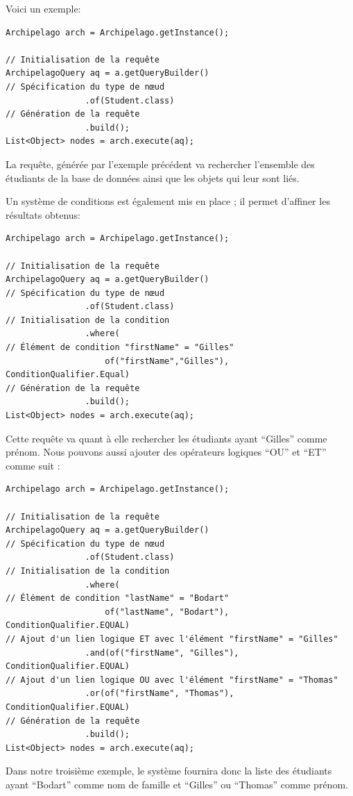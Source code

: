 \documentclass[a4paper,fleqn,12pt,oneside]{book}
\begin{document}
Voici un exemple:

\begin{lstlisting}
Archipelago arch = Archipelago.getInstance();

// Initialisation de la requête
ArchipelagoQuery aq = a.getQueryBuilder()
// Spécification du type de nœud
                .of(Student.class)
// Génération de la requête
                .build();
List<Object> nodes = arch.execute(aq);
\end{lstlisting}

La requête, générée par l'exemple précédent va rechercher l'ensemble des étudiants de la base de données ainsi que les objets qui leur sont liés.

Un système de conditions est également mis en place ; il permet d'affiner les résultats obtenus: 

\begin{lstlisting}
Archipelago arch = Archipelago.getInstance();

// Initialisation de la requête
ArchipelagoQuery aq = a.getQueryBuilder()
// Spécification du type de nœud
                .of(Student.class)
// Initialisation de la condition
                .where(
// Élément de condition "firstName" = "Gilles"
                	of("firstName","Gilles"), ConditionQualifier.Equal)
// Génération de la requête
                .build();
List<Object> nodes = arch.execute(aq);
\end{lstlisting}

Cette requête va quant à elle rechercher les étudiants ayant \enquote{Gilles} comme prénom.
\newpage
Nous pouvons aussi ajouter des opérateurs logiques \enquote{OU} et \enquote{ET} comme suit :
\begin{lstlisting}
Archipelago arch = Archipelago.getInstance();

// Initialisation de la requête
ArchipelagoQuery aq = a.getQueryBuilder()
// Spécification du type de nœud
                .of(Student.class)
// Initialisation de la condition
                .where(
// Élément de condition "lastName" = "Bodart"
                	of("lastName", "Bodart"), ConditionQualifier.EQUAL)
// Ajout d'un lien logique ET avec l'élément "firstName" = "Gilles"
                .and(of("firstName", "Gilles"), ConditionQualifier.EQUAL)
// Ajout d'un lien logique OU avec l'élément "firstName" = "Thomas"
                .or(of("firstName", "Thomas"), ConditionQualifier.EQUAL)
// Génération de la requête
                .build();
List<Object> nodes = arch.execute(aq);
\end{lstlisting}
Dans notre troisième exemple, le système fournira donc la liste des étudiants ayant \enquote{Bodart} comme nom de famille et \enquote{Gilles} ou \enquote{Thomas} comme prénom. 
\end{document}

